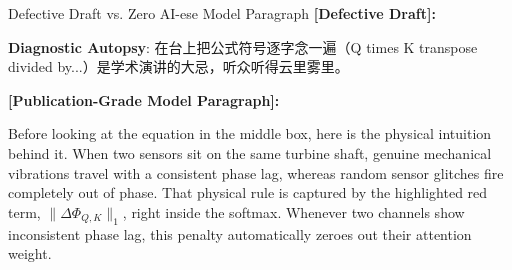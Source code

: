 \begin{ExampleBox}{Defective Draft vs. Zero AI-ese Model Paragraph}
\textbf{\color{TargetHighlight}[Defective Draft]:}\par
{}\par\vspace{4pt}
\textbf{Diagnostic Autopsy}: 在台上把公式符号逐字念一遍（Q times K transpose divided by...）是学术演讲的大忌，听众听得云里雾里。\par\vspace{6pt}
\textbf{\color{AcadNavy}[Publication-Grade Model Paragraph]:}\par
Before looking at the equation in the middle box, here is the physical intuition behind it. When two sensors sit on the same turbine shaft, genuine mechanical vibrations travel with a consistent phase lag, whereas random sensor glitches fire completely out of phase. That physical rule is captured by the highlighted red term, $\|\Delta \Phi_{Q,K}\|_1$, right inside the softmax. Whenever two channels show inconsistent phase lag, this penalty automatically zeroes out their attention weight.
\end{ExampleBox}
